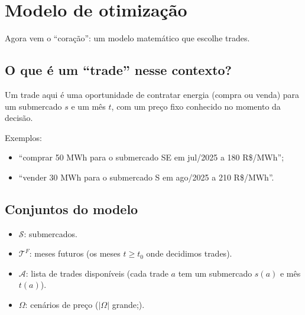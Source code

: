 \documentclass{article}
\begin{document}
\section{Modelo de otimização}

Agora vem o ``coração'': um modelo matemático que escolhe trades.

\subsection{O que é um ``trade'' nesse contexto?}
Um trade aqui é uma oportunidade de contratar energia (compra ou venda) para um submercado $s$
e um mês $t$, com um preço fixo conhecido no momento da decisão.

Exemplos:
\begin{itemize}
    \item ``comprar 50 MWh para o submercado SE em jul/2025 a 180 R\$/MWh'';
    \item ``vender 30 MWh para o submercado S em ago/2025 a 210 R\$/MWh''.
\end{itemize}

\subsection{Conjuntos do modelo}
\begin{itemize}
    \item $\mathcal{S}$: submercados.
    \item $\mathcal{T}^{F}$: meses futuros (os meses $t \ge t_0$ onde decidimos trades).
    \item $\mathcal{A}$: lista de trades disponíveis (cada trade $a$ tem um submercado $s(a)$ e mês $t(a)$).
    \item $\Omega$: cenários de preço ($|\Omega|$ grande;).
\end{itemize}
\end{document}
